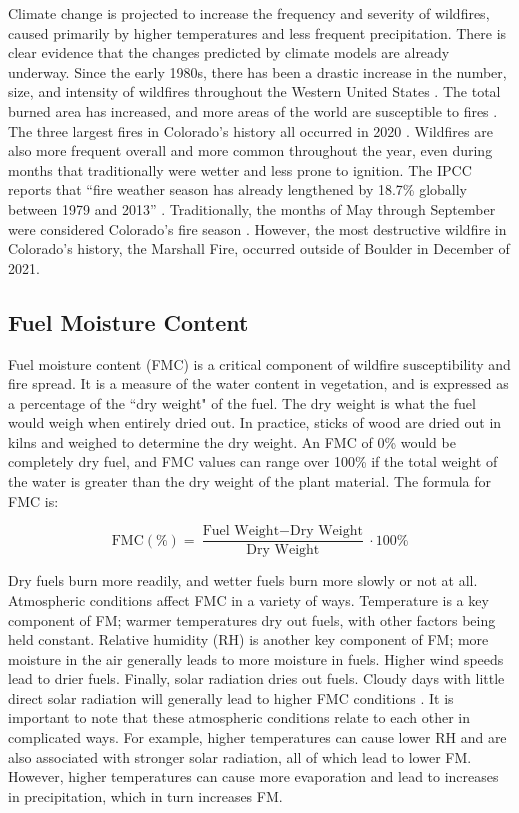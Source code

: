 \documentclass[11pt]{article}%
\begin{document}
Climate change is projected to increase the frequency and severity of wildfires, caused primarily by higher temperatures and less frequent precipitation. There is clear evidence that the changes predicted by climate models are already underway. Since the early 1980s, there has been a drastic increase in the number, size, and intensity of wildfires throughout the Western United States \cite{Cartier-2022-UFQ}. The total burned area has increased, and more areas of the world are susceptible to fires \cite{IPCC-2021-LCI}. The three largest fires in Colorado’s history all occurred in 2020 \cite{CDFPC-2024-HWI}. Wildfires are also more frequent overall and more common throughout the year, even during months that traditionally were wetter and less prone to ignition. The IPCC  reports that “fire weather season has already lengthened by 18.7\% globally between 1979 and 2013” \cite{IPCC-2021-LCI}. Traditionally, the months of May through September were considered Colorado’s fire season \cite{WFCA-2023-CFS}. However, the most destructive wildfire in Colorado’s history, the Marshall Fire, occurred outside of Boulder in December of 2021. \cite{CDFPC-2024-HWI} 


\subsection{Fuel Moisture Content}

Fuel moisture content (FMC) is a critical component of wildfire susceptibility and fire spread. It is a measure of the water content in vegetation, and is expressed as a percentage of the ``dry weight" of the fuel. \cite{NCEI-2024-DFM} The dry weight is what the fuel would weigh when entirely dried out. In practice, sticks of wood are dried out in kilns and weighed to determine the dry weight. An FMC of 0\% would be completely dry fuel, and FMC values can range over 100\% if the total weight of the water is greater than the dry weight of the plant material. The formula for FMC is:

\begin{equation}
    \text{FMC} (\%) = \frac{\text{Fuel Weight} - \text{Dry Weight}}{\text{Dry Weight}} \cdot 100\%
\end{equation}

Dry fuels burn more readily, and wetter fuels burn more slowly or not at all. Atmospheric conditions affect FMC in a variety of ways. Temperature is a key component of FM; warmer temperatures dry out fuels, with other factors being held constant. Relative humidity (RH) is another key component of FM; more moisture in the air generally leads to more moisture in fuels. Higher wind speeds lead to drier fuels. Finally, solar radiation dries out fuels. Cloudy days with little direct solar radiation will generally lead to higher FMC conditions \cite{NWCG-2024-FWP}. It is important to note that these atmospheric conditions relate to each other in complicated ways. For example, higher temperatures can cause lower RH and are also associated with stronger solar radiation, all of which lead to lower FM. However, higher temperatures can cause more evaporation and lead to increases in precipitation, which in turn increases FM. 
\end{document}
